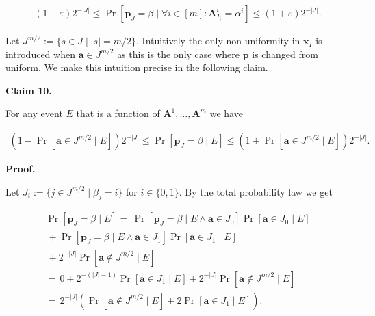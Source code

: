 \[\begin{gathered}
(1-\varepsilon)2^{-|J|}\leq\Pr[\bm{p}_{J}=\beta\mid\forall i\in[m]:\bm{A}^{i}_{I_{i}}=\alpha^{i}]\leq(1+\varepsilon)2^{-|J|}.
\end{gathered}\]


Let
$J^{m/2}:=\{s\in J\mid|s|=m/2\}.$
Intuitively the only non-uniformity in $\bm{x}_{I}$ is introduced when $\bm{a}\in J^{m/2}$ as this is the
only case where $\bm{p}$ is changed from uniform. We make this intuition precise in the following claim.\par





\par\medskip\noindent\textbf{
Claim 10. 
}\par



For any event $E$ that is a function of $\bm{A}^{1},\ldots,\bm{A}^{m}$ we have\par


\[\begin{gathered}
(1-\Pr[\bm{a}\in J^{m/2}\mid E])2^{-|J|}\leq\Pr[\bm{p}_{J}=\beta\mid E]\leq(1+\Pr[\bm{a}\in J^{m/2}\mid E])2^{-|J|}.
\end{gathered}\]






\par\medskip\noindent\textbf{
\textbf{Proof}.}\par




Let $J_{i}:=\{j\in J^{m/2}\mid\beta_{j}=i\}$ for $i\in\{0,1\}$. By the total probability law we get\par


\[\begin{gathered}
\displaystyle\Pr[\bm{p}_{J}=\beta\mid E]= \displaystyle\,\Pr[\bm{p}_{J}=\beta\mid E\land\bm{a}\in J_{0}]\Pr[\bm{a}\in J_{0}\mid E] \\
\displaystyle\,+\Pr[\bm{p}_{J}=\beta\mid E\land\bm{a}\in J_{1}]\Pr[\bm{a}\in J_{1}\mid E] \\
\displaystyle\,+2^{-|J|}\Pr[\bm{a}\not\in J^{m/2}\mid E] \\
\displaystyle= \displaystyle\,0+2^{-(|J|-1)}\Pr[\bm{a}\in J_{1}\mid E]+2^{-|J|}\Pr[\bm{a}\not\in J^{m/2}\mid E] \\
\displaystyle= \displaystyle\,2^{-|J|}(\Pr[\bm{a}\not\in J^{m/2}\mid E]+2\Pr[\bm{a}\in J_{1}\mid E]).
\end{gathered}\]


